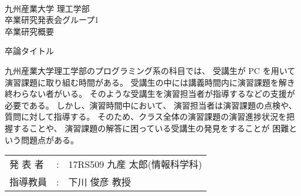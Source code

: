 \documentclass[uplatex,a4paper,12pt]{jsarticle}
\title
\renewcommand{\author}[1]{\def\author{#1}}
\renewcommand{\title}[1]{\def\title{#1}}
\newcommand{\supervisor}[1]{\def\supervisor{#1}}
\newcommand{\group}[1]{\def\group{#1}}
\newcommand{\makeheader}{
\vspace*{-20mm}
\noindent\\九州産業大学 理工学部
\noindent\\卒業研究発表会グループ\group
\noindent\\卒業研究概要
\vskip 10mm
\begin{center}
  \title 
\end{center}
\vskip 5mm
}
\newcommand{\maketailer}{
\vfill
\begin{center}
\setlength{\tabcolsep}{1mm}
\begin{tabular}[h]{p{4zw}p{1em}l}
 発 表 者&:& \author (情報科学科)\\
 指導教員&:& \supervisor
\end{tabular}
\end{center}
}
\newenvironment{rsabst}{\makeheader}{\maketailer}
\begin{document}
\title{卒論タイトル}
\author{17RS509 九産 太郎}
\supervisor{下川 俊彦 教授}
\group{1}

\begin{rsabst}


九州産業大学理工学部のプログラミング系の科目では、
受講生が PC を用いて演習課題に取り組む時間がある。
受講生の中には講義時間内に演習課題を解き終わらない者がいる。
そのような受講生を演習担当者が指導するなどの支援が必要である。
しかし、演習時間中において、
演習担当者は演習課題の点検や、
質問に対して指導する。
そのため、クラス全体の演習課題の演習進捗状況を把握することや、
演習課題の解答に困っている受講生の発見をすることが
困難という問題点がある。

\end{rsabst}
\end{document}
